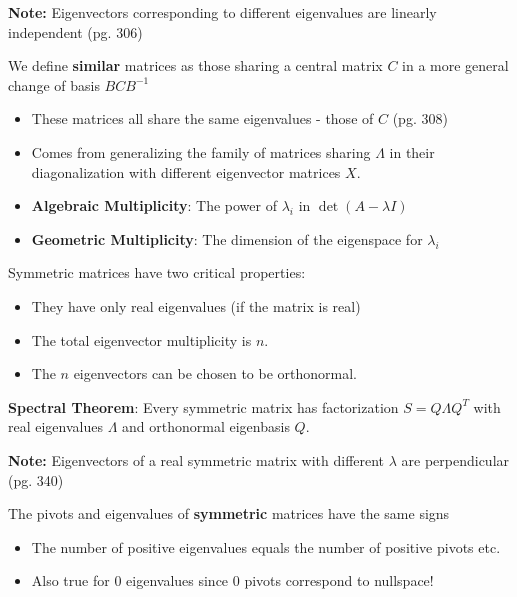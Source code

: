 \documentclass[12pt]{article} %
\begin{document}
\textbf{Note:} Eigenvectors corresponding to different eigenvalues are linearly independent (pg. 306)

We define \textbf{similar} matrices as those sharing a central matrix $C$ in a more general change of basis $BCB^{-1}$
\begin{itemize}[topsep=-1pt,itemsep=-1pt]
    \item These matrices all share the same eigenvalues - those of $C$ (pg. 308)
    \item Comes from generalizing the family of matrices sharing $\Lambda$ in their diagonalization with different eigenvector matrices $X$.
\end{itemize}
\vspace{0.4em}
\separate
\begin{itemize}[topsep=-1pt,itemsep=-1pt]
    \item \textbf{Algebraic Multiplicity}: The power of $\lambda_i$ in $\det(A-\lambda I)$
    \item \textbf{Geometric Multiplicity}: The dimension of the eigenspace for $\lambda_i$
\end{itemize}

\newpage

Symmetric matrices have two critical properties:
\begin{itemize}[topsep=-1pt,itemsep=-1pt]
    \item They have only real eigenvalues (if the matrix is real)
    \item The total eigenvector multiplicity is $n$.
    \item The $n$ eigenvectors can be chosen to be orthonormal.
\end{itemize}
\textbf{Spectral Theorem}: Every symmetric matrix has factorization $S = Q \Lambda Q^T$ with real eigenvalues $\Lambda$ and orthonormal eigenbasis $Q$.

\textbf{Note:} Eigenvectors of a real symmetric matrix with different $\lambda$ are perpendicular (pg. 340)

The pivots and eigenvalues of \textbf{symmetric} matrices have the same signs
\begin{itemize}[topsep=-1pt,itemsep=-1pt]
    \item The number of positive eigenvalues equals the number of positive pivots etc.
    \item Also true for 0 eigenvalues since 0 pivots correspond to nullspace!
\end{itemize}
\end{document}
